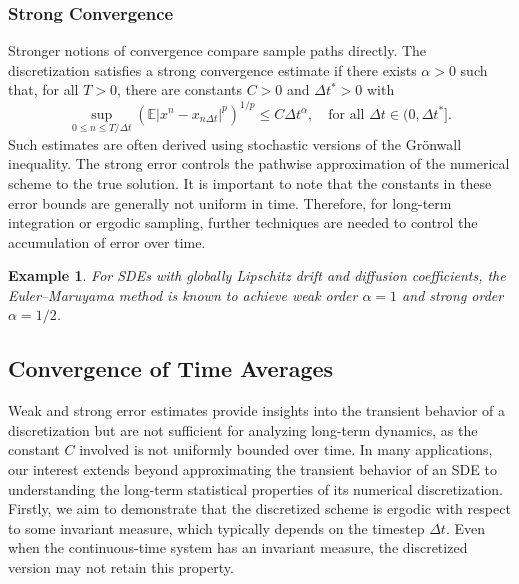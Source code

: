 \documentclass[11pt, twoside]{report}
\newtheorem{example}[theorem]{Example}
\begin{document}
\subsubsection{Strong Convergence}

Stronger notions of convergence compare sample paths directly. The discretization satisfies a strong convergence estimate if there exists $\alpha > 0$ such that, for all $T > 0$, there are constants $C > 0$ and $\Delta t^* > 0$ with
\[
\sup_{0 \leq n \leq T/\Delta t} \left( \mathbb{E} \left| x^n - x_{n\Delta t} \right|^p \right)^{1/p} \leq C \Delta t^\alpha,
\quad \text{for all } \Delta t \in (0, \Delta t^*].
\]
Such estimates are often derived using stochastic versions of the Gr\"{o}nwall inequality. The strong error controls the pathwise approximation of the numerical scheme to the true solution.
It is important to note that the constants in these error bounds are generally not uniform in time. Therefore, for long-term integration or ergodic sampling, further techniques are needed to control the accumulation of error over time.

\begin{example}
    For SDEs with globally Lipschitz drift and diffusion coefficients, the Euler–Maruyama method is known to achieve weak order $\alpha = 1$ and strong order $\alpha = 1/2$. 
\end{example}

\subsection{Convergence of Time Averages}
Weak and strong error estimates provide insights into the transient behavior of a discretization but are not sufficient for analyzing long-term dynamics, as the constant $C$ involved is not uniformly bounded over time. In many applications, our interest extends beyond approximating the transient behavior of an SDE to understanding the long-term statistical properties of its numerical discretization. Firstly, we aim to demonstrate that the discretized scheme is ergodic with respect to some invariant measure, which typically depends on the timestep $\Delta t$. Even when the continuous-time system has an invariant measure, the discretized version may not retain this property.
\end{document}
